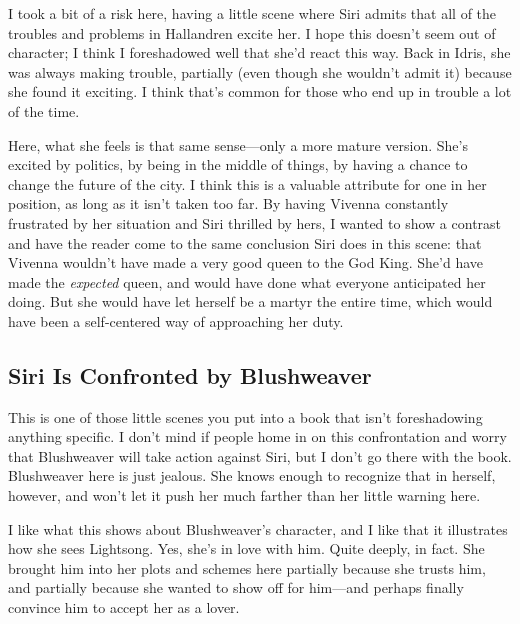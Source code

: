 I took a bit of a risk here, having a little scene where Siri admits that all of the troubles and problems in Hallandren excite her. I hope this doesn’t seem out of character; I think I foreshadowed well that she’d react this way. Back in Idris, she was always making trouble, partially (even though she wouldn’t admit it) because she found it exciting. I think that’s common for those who end up in trouble a lot of the time.

Here, what she feels is that same sense—only a more mature version. She’s excited by politics, by being in the middle of things, by having a chance to change the future of the city. I think this is a valuable attribute for one in her position, as long as it isn’t taken too far. By having Vivenna constantly frustrated by her situation and Siri thrilled by hers, I wanted to show a contrast and have the reader come to the same conclusion Siri does in this scene: that Vivenna wouldn’t have made a very good queen to the God King. She’d have made the \textit{expected} queen, and would have done what everyone anticipated her doing. But she would have let herself be a martyr the entire time, which would have been a self-centered way of approaching her duty.

\subsection*{Siri Is Confronted by Blushweaver}

This is one of those little scenes you put into a book that isn’t foreshadowing anything specific. I don’t mind if people home in on this confrontation and worry that Blushweaver will take action against Siri, but I don’t go there with the book. Blushweaver here is just jealous. She knows enough to recognize that in herself, however, and won’t let it push her much farther than her little warning here.

I like what this shows about Blushweaver’s character, and I like that it illustrates how she sees Lightsong. Yes, she’s in love with him. Quite deeply, in fact. She brought him into her plots and schemes here partially because she trusts him, and partially because she wanted to show off for him—and perhaps finally convince him to accept her as a lover.

